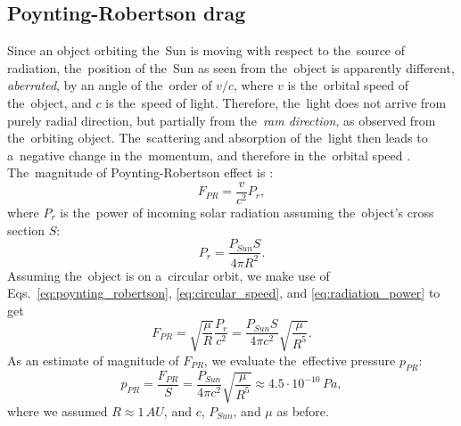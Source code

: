 
\subsection{Poynting-Robertson drag} \label{ch:pr_drag}

Since an object orbiting the~Sun is moving with respect to the~source of radiation, the~position of the~Sun as seen from the~object is apparently different, \textit{aberrated}, by an angle of the~order of $v/c$, where $v$ is the~orbital speed of the~object, and $c$ is the~speed of light. Therefore, the~light does not arrive from purely radial direction, but partially from the~\textit{ram direction}, as observed from the~orbiting object. The~scattering and absorption of the~light then leads to a~negative change in the~momentum, and therefore in the~orbital speed \citep{poynting1903radiation}. The~magnitude of Poynting-Robertson effect is \citep{robertson1937dynamical}:
\begin{equation}
    F_{PR} = \frac{v}{c^2} P_{r},
    \label{eq:poynting_robertson}
\end{equation}
where $P_r$ is the~power of incoming solar radiation assuming the~object's cross section $S$: 
\begin{equation}
    P_{r} = \frac{P_{Sun} S}{4 \pi R^2}.
    \label{eq:radiation_power}
\end{equation}
Assuming the~object is on a~circular orbit, we make use of Eqs.~\ref{eq:poynting_robertson}, \ref{eq:circular_speed}, and \ref{eq:radiation_power} to get
\begin{equation}
    F_{PR} = \sqrt{\frac{\mu}{R}} \frac{P_{r}}{c^2} = \frac{P_{Sun}S}{4 \pi c^2} \sqrt{\frac{\mu}{R^5}}. 
\end{equation}
As an estimate of magnitude of $F_{PR}$, we evaluate the~effective pressure $p_{PR}$:
\begin{equation}
    p_{PR} = \frac{F_{PR}}{S} = \frac{P_{Sun}}{4 \pi c^2} \sqrt{\frac{\mu}{R^5}} \approx 4.5 \cdot 10^{-10} \, \si{Pa},
\end{equation}
where we assumed $R \approx 1 \, \si{AU}$, and $c$, $P_{Sun}$, and $\mu$ as before.

